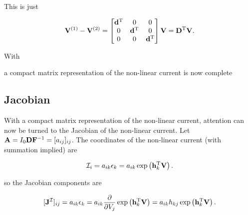 \documentclass[12pt,journal,compsoc]{../ieeepaper/IEEEtran}
\begin{document}
This is just

\begin{equation}\label{eqn:ece1254projectReport:1400}
\BV^{(1)} - \BV^{(2)} 
=
\begin{bmatrix}
\Bd^\T & 0 & 0 \\
0 & \Bd^\T & 0 \\
0 & 0 & \Bd^\T \\
\end{bmatrix}
\BV
= \BD^\T \BV.
\end{equation}

With

a compact matrix representation of the non-linear current is now complete


\subsection{Jacobian}

With a compact matrix representation of the non-linear current, attention can now be turned to the Jacobian of the non-linear current.  Let \( \mathbf{A} = I_0 \mathbf{D} \mathbf{F}^{-1} = [ a_{ij} ]_{ij} \).  The coordinates of the non-linear current (with summation implied) are

\begin{dmath}\label{eqn:ece1254projectReport:1120}
\mathcal{I}_i = a_{ik} \epsilon_k = a_{ik} \exp\lr{ \Bh_k^\T \BV }.
\end{dmath}

so the Jacobian components are

\begin{dmath}\label{eqn:ece1254projectReport:1140}
[\BJ^{\mathcal{I}}]_{ij} 
= 
a_{ik} \epsilon_k = a_{ik} 
\PD{V_j}{}
\exp\lr{ \Bh_k^\T \BV }
= 
a_{ik} 
h_{kj}
\exp\lr{ \Bh_k^\T \BV }.
\end{dmath}
\end{document}
